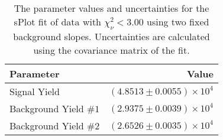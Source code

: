 
\begin{table}[ht]
    \begin{center}
        \begin{tabular}{lr}\toprule
            Parameter & Value \\\midrule
            Signal Yield & $(4.8513 \pm 0.0055) \times 10^{4}$ \\
            Background Yield $\#1$ & $(2.9375 \pm 0.0039) \times 10^{4}$ \\
            Background Yield $\#2$ & $(2.6526 \pm 0.0035) \times 10^{4}$ \\\bottomrule
        \end{tabular}
        \caption{The parameter values and uncertainties for the sPlot fit of data with $\chi^2_\nu < 3.00$ using two fixed background slopes. Uncertainties are calculated using the covariance matrix of the fit.}\label{tab:splot-fit-results-chisqdof-3.00-fixed-2}
    \end{center}
\end{table}
